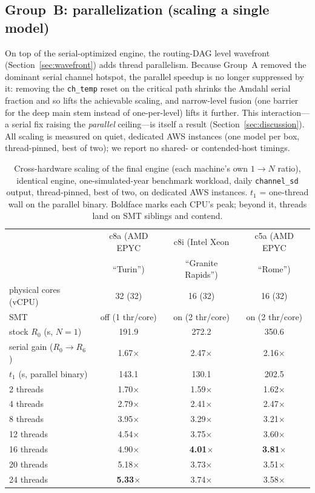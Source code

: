 \subsection{Group~B: parallelization (scaling a single model)}\label{sec:groupB}
On top of the serial-optimized engine, the routing-DAG level wavefront (Section~\ref{sec:wavefront})
adds thread parallelism. Because Group~A removed the dominant serial channel hotspot, the parallel
speedup is no longer suppressed by it: removing the \texttt{ch\_temp} reset on the critical path
shrinks the Amdahl serial fraction and so lifts the achievable scaling, and narrow-level fusion (one
barrier for the deep main stem instead of one-per-level) lifts it further. This interaction---a
serial fix raising the \emph{parallel} ceiling---is itself a result (Section~\ref{sec:discussion}).
All scaling is measured on quiet, dedicated AWS instances (one model per box, thread-pinned, best of
two); we report no shared- or contended-host timings.

\begin{table}[t]
\centering
\caption{Cross-hardware scaling of the final engine (each machine's own $1\rightarrow N$ ratio),
identical engine, one-simulated-year benchmark workload, daily \texttt{channel\_sd} output,
thread-pinned, best of two, on dedicated AWS instances. $t_1$ = one-thread wall on the parallel
binary. Boldface marks each CPU's peak; beyond it, threads land on SMT siblings and contend.}
\label{tab:crosshw}
\begin{tabular}{lccc}
\toprule
 & c8a (AMD EPYC & c8i (Intel Xeon & c5a (AMD EPYC \\
 & ``Turin'') & ``Granite Rapids'') & ``Rome'') \\
\midrule
physical cores (vCPU)           & 32 (32) & 16 (32) & 16 (32) \\
SMT                             & off (1 thr/core) & on (2 thr/core) & on (2 thr/core) \\
stock $R_0$ (s, $N{=}1$)        & 191.9 & 272.2 & 350.6 \\
serial gain ($R_0{\to}R_6$)     & 1.67$\times$ & 2.47$\times$ & 2.16$\times$ \\
$t_1$ (s, parallel binary)      & 143.1 & 130.1 & 202.5 \\
\midrule
2 threads     & 1.70$\times$ & 1.59$\times$ & 1.62$\times$ \\
4 threads     & 2.79$\times$ & 2.41$\times$ & 2.47$\times$ \\
8 threads     & 3.95$\times$ & 3.29$\times$ & 3.21$\times$ \\
12 threads    & 4.54$\times$ & 3.75$\times$ & 3.60$\times$ \\
16 threads    & 4.90$\times$ & \textbf{4.01$\times$} & \textbf{3.81$\times$} \\
20 threads    & 5.18$\times$ & 3.73$\times$ & 3.51$\times$ \\
24 threads    & \textbf{5.33$\times$} & 3.74$\times$ & 3.58$\times$ \\
\bottomrule
\end{tabular}
\end{table}

